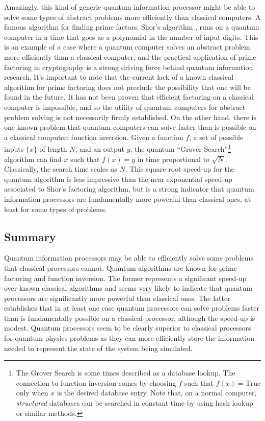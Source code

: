 Amazingly, this kind of generic quantum information processor might be able to solve some types of abstract problems more efficiently than classical computers.
A famous algorithm for finding prime factors, Shor's algorithm \cite{Shor:algorithm1994}, runs on a quantum computer in a time that goes as a polynomial in the number of input digits.
This is an example of a case where a quantum computer solves an abstract problem more efficiently than a classical computer, and the practical application of prime factoring in cryptography is a strong driving force behind quantum information research.
It's important to note that the current lack of a known classical algorithm for prime factoring does not preclude the possibility that one will be found in the future.
It has not been proven that efficient factoring on a classical computer is impossible, and so the utility of quantum computers for abstract problem solving is not necessarily firmly established.
On the other hand, there is one known problem that quantum computers can solve faster than is possible on a classical computer: function inversion.
Given a function $f$, a set of possible inputs $\{x\}$ of length $N$, and an output $y$, the quantum ``Grover Search''\footnote{The Grover Search is some times described as a database lookup. The connection to function inversion comes by choosing $f$ such that $f(x)=\text{True}$ only when $x$ is the desired database entry. Note that, on a normal computer, \emph{structured} databases can be searched in constant time by using hash lookup or similar methods.} algorithm can find $x$ such that $f(x)=y$ in time proportional to $\sqrt{N}$.
Classically, the search time scales as $N$.
This square root speed-up for the quantum algorithm is less impressive than the near exponential speed-up associated to Shor's factoring algorithm, but is a strong indicator that quantum information processors are fundamentally more powerful than classical ones, at least for some types of problems.

\subsection{Summary}

Quantum information processors may be able to efficiently solve some problems that classical processors cannot. Quantum algorithms are known for prime factoring and function inversion.
The former represents a significant speed-up over known classical algorithms and seems very likely to indicate that quantum processors are significantly more powerful than classical ones.
The latter establishes that in at least one case quantum processors can solve problems faster than is fundamentally possible on a classical processor, although the speed-up is modest.
Quantum processors seem to be clearly superior to classical processors for quantum physics problems as they can more efficiently store the information needed to represent the state of the system being simulated.

